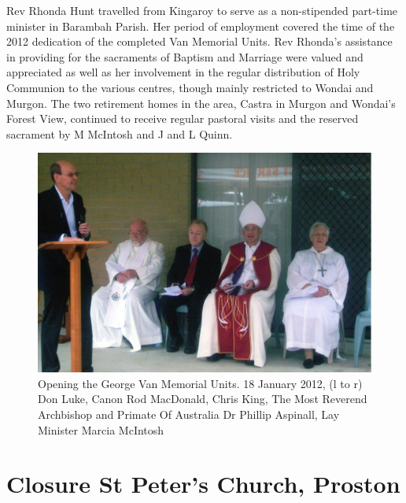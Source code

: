 Rev Rhonda Hunt travelled from Kingaroy to serve as a non-stipended part-time minister in Barambah Parish. Her period of employment covered the time of the 2012 dedication of the completed Van Memorial Units. Rev Rhonda's assistance in providing for the sacraments of Baptism and Marriage were valued and appreciated as well as her involvement in the regular distribution of Holy Communion to the various centres, though mainly restricted to Wondai and Murgon. The two retirement homes in the area, Castra in Murgon and Wondai's Forest View, continued to receive regular pastoral visits and the reserved sacrament by M McIntosh and J and L Quinn.









\begin{figure}[!htb]
\begin{center}
\includegraphics[width=1.\textwidth,center]{../images/openingGeorgeVannMemorialUnits.jpg}
\caption{Opening the George Van Memorial Units. 18 January 2012, (l to r) Don Luke, Canon Rod MacDonald, Chris King, The Most Reverend Archbishop and Primate Of Australia Dr Phillip Aspinall, Lay Minister Marcia McIntosh}
\end{center}
\end{figure}




\section{Closure St Peter's Church, Proston}



